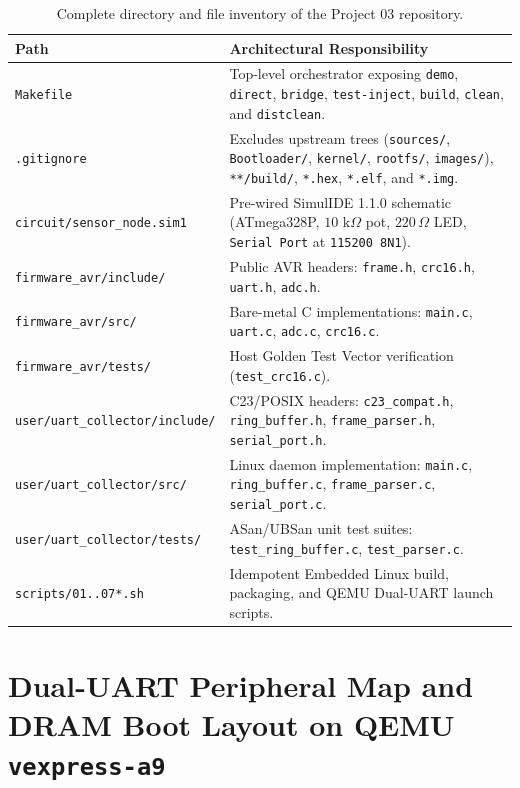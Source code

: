 \documentclass[11pt,a4paper,oneside]{report}
\begin{document}
\begin{table}[!htbp]
\centering
\caption{Complete directory and file inventory of the Project 03 repository.}
\label{tab:ch1_repo}
\begin{tabularx}{\linewidth}{l X}
\toprule
\textbf{Path} & \textbf{Architectural Responsibility} \\
\midrule
\texttt{Makefile} & Top-level orchestrator exposing \texttt{demo}, \texttt{direct}, \texttt{bridge}, \texttt{test-inject}, \texttt{build}, \texttt{clean}, and \texttt{distclean}. \\
\texttt{.gitignore} & Excludes upstream trees (\texttt{sources/}, \texttt{Bootloader/}, \texttt{kernel/}, \texttt{rootfs/}, \texttt{images/}), \texttt{**/build/}, \texttt{*.hex}, \texttt{*.elf}, and \texttt{*.img}. \\
\texttt{circuit/sensor\_node.sim1} & Pre-wired SimulIDE 1.1.0 schematic (ATmega328P, $10\text{ k}\Omega$ pot, $220\,\Omega$ LED, \texttt{Serial Port} at \texttt{115200 8N1}). \\
\texttt{firmware\_avr/include/} & Public AVR headers: \texttt{frame.h}, \texttt{crc16.h}, \texttt{uart.h}, \texttt{adc.h}. \\
\texttt{firmware\_avr/src/} & Bare-metal C implementations: \texttt{main.c}, \texttt{uart.c}, \texttt{adc.c}, \texttt{crc16.c}. \\
\texttt{firmware\_avr/tests/} & Host Golden Test Vector verification (\texttt{test\_crc16.c}). \\
\texttt{user/uart\_collector/include/} & C23/POSIX headers: \texttt{c23\_compat.h}, \texttt{ring\_buffer.h}, \texttt{frame\_parser.h}, \texttt{serial\_port.h}. \\
\texttt{user/uart\_collector/src/} & Linux daemon implementation: \texttt{main.c}, \texttt{ring\_buffer.c}, \texttt{frame\_parser.c}, \texttt{serial\_port.c}. \\
\texttt{user/uart\_collector/tests/} & ASan/UBSan unit test suites: \texttt{test\_ring\_buffer.c}, \texttt{test\_parser.c}. \\
\texttt{scripts/01..07*.sh} & Idempotent Embedded Linux build, packaging, and QEMU Dual-UART launch scripts. \\
\bottomrule
\end{tabularx}
\end{table}

\section{Dual-UART Peripheral Map and DRAM Boot Layout on QEMU \texttt{vexpress-a9}}
\end{document}

